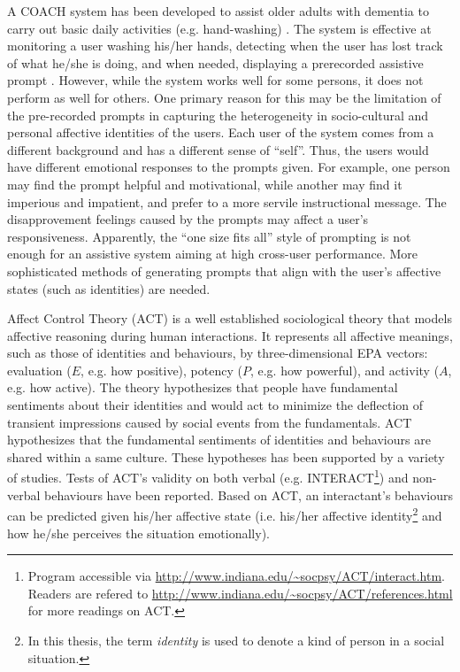 A COACH system has been developed to assist older adults with dementia to carry out basic daily activities (e.g. hand-washing) \cite{boger2005decision, mihailidis2008coach}. The system is effective at monitoring a user washing his/her hands, detecting when the user has lost track of what he/she is doing, and when needed, displaying a prerecorded assistive prompt \cite{mihailidis2008coach}. However, while the system works well for some persons, it does not perform as well for others. One primary reason for this may be the limitation of the pre-recorded prompts in capturing the heterogeneity in socio-cultural and personal affective identities of the users. Each user of the system comes from a different background and has a different sense of ``self''. Thus, the users would have different emotional responses to the prompts given. For example, one person may find the prompt helpful and motivational, while another may find it imperious and impatient, and prefer to a more servile instructional message. The disapprovement feelings caused by the prompts may affect a user's responsiveness. Apparently, the ``one size fits all'' style of prompting is not enough for an assistive system aiming at high cross-user performance. More sophisticated methods of generating prompts that align with the user's affective states (such as identities) are needed.

Affect Control Theory (ACT) \cite{robinson2006affect} is a well established sociological theory that models affective reasoning during human interactions. It represents all affective meanings, such as those of identities and behaviours, by three-dimensional EPA vectors: evaluation ($E$, e.g. how positive), potency ($P$, e.g. how powerful), and activity ($A$, e.g. how active). The theory hypothesizes that people have fundamental sentiments about their identities and would act to minimize the deflection of transient impressions caused by social events from the fundamentals. ACT hypothesizes that the fundamental sentiments of identities and behaviours are shared within a same culture. These hypotheses has been supported by a variety of studies. Tests of ACT's validity on both verbal (e.g. INTERACT\footnote{Program accessible via \url{http://www.indiana.edu/~socpsy/ACT/interact.htm}. Readers are refered to \url{http://www.indiana.edu/~socpsy/ACT/references.html} for more readings on ACT.}) and non-verbal behaviours \cite{schroder2013culture} have been reported. Based on ACT, an interactant's behaviours can be predicted given his/her affective state (i.e. his/her affective identity\footnote{In this thesis, the term \textit{identity} is used to denote a kind of person in a social situation.} and how he/she perceives the situation emotionally).

